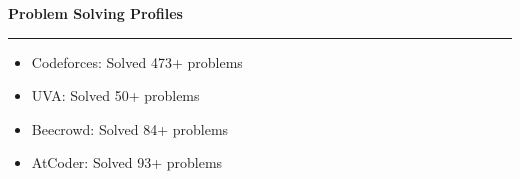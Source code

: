 \documentclass[10pt,a4paper]{article}
\newcommand{\rightsection}[1]{%
    \vspace{6pt}
    {\color{textdark}\large\bfseries #1}\\[-2pt]
    {\color{accent}\rule{\linewidth}{0.8pt}}\vspace{4pt}
}
\begin{document}
\begin{minipage}[t][0.95\textheight][t]{0.62\textwidth}
\rightsection{Problem Solving Profiles}
\begin{itemize}
    \item Codeforces: Solved 473+ problems
    \item UVA: Solved 50+ problems
    \item Beecrowd: Solved 84+ problems
    \item AtCoder: Solved 93+ problems
\end{itemize}

\end{minipage}
\end{document}
